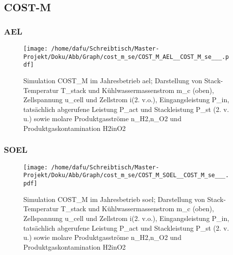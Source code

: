 \documentclass[onecolumn,10pt,titlepage]{article}
\begin{document}
\subsection{COST-M}
\subsubsection{AEL}
\begin{figure}
	\centering
	\texttt{[image: /home/dafu/Schreibtisch/Master-Projekt/Doku/Abb/Graph/cost\_m\_se/COST\_M\_AEL\_\_COST\_M\_se\_\_\_.pdf]}

	\caption[Simulation COST\_M im Jahresbetrieb \gls{ael}]{Simulation COST\_M im Jahresbetrieb \gls{ael}; Darstellung von Stack-Temperatur \gls{T_stack} und Kühlwassermassenstrom \gls{m_c} (oben), Zellspannung \gls{u_cell} und Zellstrom \gls{i}(2. v.o.), Eingangsleistung \gls{P_in},  tatsächlich abgerufene Leistung \gls{P_act} und Stackleistung \gls{P_st} (2. v. u.) sowie molare Produktgasströme \gls{n_H2},\gls{n_O2} und Produktgaskontamination \gls{H2inO2}}
	\label{fig:plt_se_COST_ALE}
\end{figure}
\subsubsection{SOEL}
\begin{figure}
	\centering
	\texttt{[image: /home/dafu/Schreibtisch/Master-Projekt/Doku/Abb/Graph/cost\_m\_se/COST\_M\_SOEL\_\_COST\_M\_se\_\_\_.pdf]}

	\caption[Simulation COST\_M im Jahresbetrieb \gls{soel}]{Simulation COST\_M im Jahresbetrieb \gls{soel}; Darstellung von Stack-Temperatur \gls{T_stack} und Kühlwassermassenstrom \gls{m_c} (oben), Zellspannung \gls{u_cell} und Zellstrom \gls{i}(2. v.o.), Eingangsleistung \gls{P_in},  tatsächlich abgerufene Leistung \gls{P_act} und Stackleistung \gls{P_st} (2. v. u.) sowie molare Produktgasströme \gls{n_H2},\gls{n_O2} und Produktgaskontamination \gls{H2inO2}}
	\label{fig:plt_se_COST_SOEL}
\end{figure}
\end{document}
